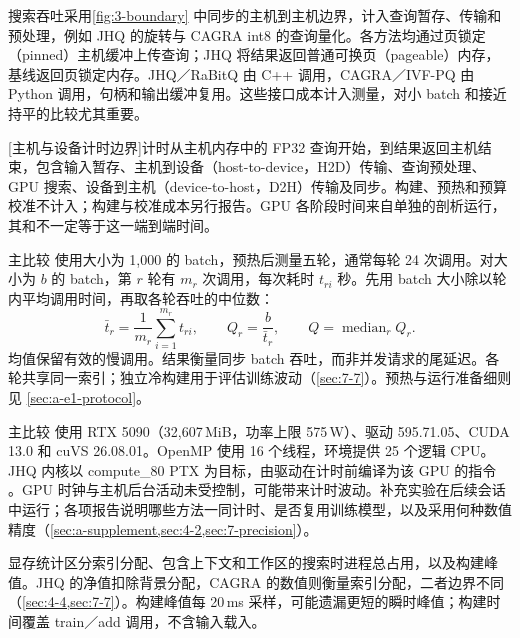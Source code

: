 搜索吞吐采用\cref{fig:3-boundary} 中同步的主机到主机边界，计入查询暂存、传输和预处理，例如 JHQ 的旋转与 CAGRA int8 的查询量化。各方法均通过页锁定（pinned）主机缓冲上传查询；JHQ 将结果返回普通可换页（pageable）内存，基线返回页锁定内存。JHQ／RaBitQ 由 C++ 调用，CAGRA／IVF-PQ 由 Python 调用，句柄和输出缓冲复用。这些接口成本计入测量，对小 batch 和接近持平的比较尤其重要。

\par\medskip\noindent\begin{minipage}{\linewidth}
\centering\captionsetup{hypcap=false}
\resizebox{\linewidth}{!}{}
[主机与设备计时边界]{计时从主机内存中的 FP32 查询开始，到结果返回主机结束，包含输入暂存、主机到设备（host-to-device，H2D）传输、查询预处理、GPU 搜索、设备到主机（device-to-host，D2H）传输及同步。构建、预热和预算校准不计入；构建与校准成本另行报告。GPU 各阶段时间来自单独的剖析运行，其和不一定等于这一端到端时间。}
\label{fig:3-boundary}
\end{minipage}\par\medskip

主比较 使用大小为 1,000 的 batch，预热后测量五轮，通常每轮 24 次调用。对大小为 $b$ 的 batch，第 $r$ 轮有 $m_r$ 次调用，每次耗时 $t_{ri}$ 秒。先用 batch 大小除以轮内平均调用时间，再取各轮吞吐的中位数：
\begin{equation}
 \bar t_r=\frac1{m_r}\sum_{i=1}^{m_r}t_{ri},
 \qquad Q_r=\frac b{\bar t_r},
 \qquad Q=\operatorname{median}_r Q_r.
 \label{eq:3-throughput}
\end{equation}
均值保留有效的慢调用。结果衡量同步 batch 吞吐，而非并发请求的尾延迟。各轮共享同一索引；独立冷构建用于评估训练波动（\cref{sec:7-7}）。预热与运行准备细则见 \cref{sec:a-e1-protocol}。

主比较 使用 RTX 5090（32,607\,MiB，功率上限 575\,W）、驱动 595.71.05、CUDA 13.0 和 cuVS 26.08.01。OpenMP 使用 16 个线程，环境提供 25 个逻辑 CPU。JHQ 内核以 compute\_80 PTX 为目标，由驱动在计时前编译为该 GPU 的指令 \cite{cuda_platform}。GPU 时钟与主机后台活动未受控制，可能带来计时波动。补充实验在后续会话中运行；各项报告说明哪些方法一同计时、是否复用训练模型，以及采用何种数值精度（\cref{sec:a-supplement,sec:4-2,sec:7-precision}）。

显存统计区分索引分配、包含上下文和工作区的搜索时进程总占用，以及构建峰值。JHQ 的净值扣除背景分配，CAGRA 的数值则衡量索引分配，二者边界不同（\cref{sec:4-4,sec:7-7}）。构建峰值每 20\,ms 采样，可能遗漏更短的瞬时峰值；构建时间覆盖 train／add 调用，不含输入载入。
